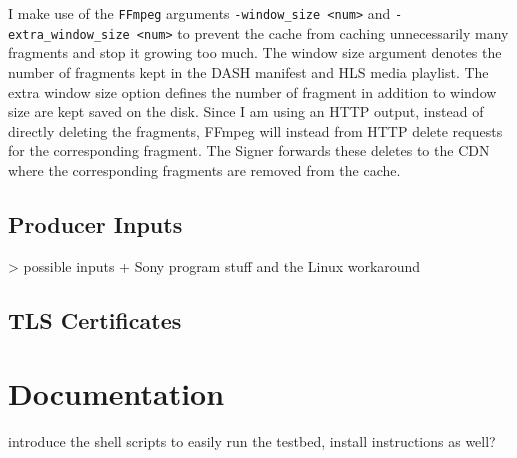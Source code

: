 I make use of the \texttt{FFmpeg} arguments \texttt{-window\_size <num>} and \texttt{-extra\_window\_size <num>} to prevent the cache from caching unnecessarily many fragments and stop it growing too much. The window size argument denotes the number of fragments kept in the DASH manifest and HLS media playlist. The extra window size option defines the number of fragment in addition to window size are kept saved on the disk. Since I am using an HTTP output, instead of directly deleting the fragments, FFmpeg will instead from HTTP delete requests for the corresponding fragment. The Signer forwards these deletes to the CDN where the corresponding fragments are removed from the cache.

\subsection{Producer Inputs\label{sec:producer_inputs}}

> possible inputs + Sony program stuff and the Linux workaround

\subsection{TLS Certificates}


\section{Documentation\label{sec:docu}}

introduce the shell scripts to easily run the testbed, install instructions as well?
